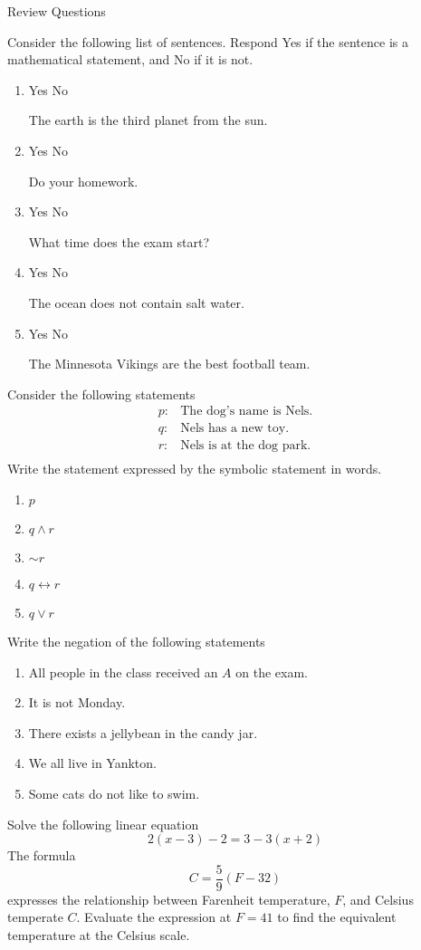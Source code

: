 \documentclass[addpoints,12pt]{exam}
\newcommand{\ynn}{
\begin{oneparcheckboxes}
\choice Yes
\CorrectChoice No
	\end{oneparcheckboxes}
}
\newcommand{\yny}{
\begin{oneparcheckboxes}
\CorrectChoice Yes
\choice No 
	\end{oneparcheckboxes}
}
\theoremstyle{definition}
\begin{document}
\begin{center}
    \Huge Review Questions
\end{center}
\begin{questions}
\question Consider the following list of sentences. Respond Yes if the sentence is a mathematical statement, and No if it is not. 
\begin{enumerate}[label = \alph*)]
	\item \yny The earth is the third planet from the sun.   
	\item \ynn Do your homework. 
	\item \ynn What time does the exam start? 
	\item \yny The ocean does not contain salt water. 
	\item \ynn The Minnesota Vikings are the best football team.  
\end{enumerate}
\question Consider the following statements 
\begin{align*}
	p:  & \text{The dog's name  is Nels.} \\
	q: & \text{Nels has a new toy. } \\
	r: & \text{Nels is at the dog park.} \\
\end{align*}
Write the statement expressed by the symbolic statement in words. 
\begin{enumerate}[label = \alph*)]
    \item $p $ 
		\item $q \wedge r$ 
		\item $\sim r $
		\item $q \leftrightarrow  r $ 
		\item  $q \vee r $
\end{enumerate}
\question Write the negation of the following statements 
\begin{enumerate}[label = \alph*)]
	\item All people in the class received an $A$ on the exam. 
	\item It is not Monday. 
	\item There exists a jellybean in the candy jar. 
	\item We all live in Yankton. 
	\item Some cats do not like to swim. 
\end{enumerate}
\question Solve the following linear equation 
\[
2(x-3)-2 = 3-3(x+2) 
\]
\question The formula 
\[
C = \frac{5}{9}(F-32)
\]
expresses the relationship between Farenheit temperature, $F$, and Celsius temperate $C$. Evaluate the expression at $F = 41$ to find the equivalent temperature at the Celsius scale. 

\end{questions}
\end{document}
